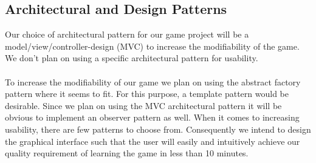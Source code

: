 \subsection{Architectural and Design Patterns}

Our choice of architectural pattern for our game project will be a model/view/controller-design (MVC) to increase the modifiability of the game. We don't plan on using a specific architectural pattern for usability.\\
\\
To increase the modifiability of our game we plan on using the abstract factory pattern where it seems to fit. For this purpose, a template pattern would be desirable. Since we plan on using the MVC architectural pattern it will be obvious to implement an observer pattern as well. When it comes to increasing usability, there are few patterns to choose from. Consequently we intend to design the graphical interface such that the user will easily and intuitively achieve our quality requirement of learning the game in less than 10 minutes.\\